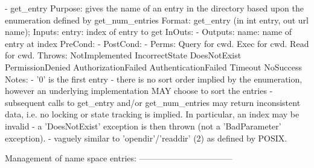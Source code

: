 \begin{myspec}
 
    - get_entry 
      Purpose:  gives the name of an entry in the directory
                based upon the enumeration defined by
                get_num_entries
      Format:   get_entry          (in  int       entry,
                                    out url       name);
      Inputs:   entry:              index of entry to get
      InOuts:   -
      Outputs:  name:               name of entry at index
      PreCond:  -
      PostCond: -
      Perms:    Query for cwd.
                Exec  for cwd.
                Read  for cwd.
      Throws:   NotImplemented
                IncorrectState
                DoesNotExist
                PermissionDenied
                AuthorizationFailed
                AuthenticationFailed
                Timeout
                NoSuccess
      Notes:    - '0' is the first entry
                - there is no sort order implied by the
                  enumeration, however an underlying
                  implementation MAY choose to sort the entries
                - subsequent calls to get_entry and/or
                  get_num_entries may return inconsistent data,
                  i.e. no locking or state tracking is implied.
                  In particular, an index may be invalid - a
                  'DoesNotExist' exception is then thrown (not a
                  'BadParameter' exception).
                - vaguely similar to 'opendir'/'readdir' (2) as
                  defined by POSIX.
 
 
    Management of name space entries:
    ---------------------------------
 

\end{myspec}
